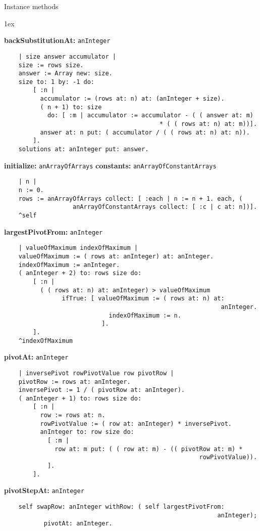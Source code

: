 Instance methods
{\parskip 1ex\par\noindent}
{\bf backSubstitutionAt:} {\tt anInteger}
\begin{verbatim}
    | size answer accumulator |
    size := rows size.
    answer := Array new: size.
    size to: 1 by: -1 do:
        [ :n |
          accumulator := (rows at: n) at: (anInteger + size).
          ( n + 1) to: size
            do: [ :m | accumulator := accumulator - ( ( answer at: m) 
                                           * ( ( rows at: n) at: m))].
          answer at: n put: ( accumulator / ( ( rows at: n) at: n)).
        ].
    solutions at: anInteger put: answer.

\end{verbatim}
{\bf initialize:} {\tt anArrayOfArrays} {\bf constants:} {\tt anArrayOfConstantArrays}
\begin{verbatim}
    | n |
    n := 0.
    rows := anArrayOfArrays collect: [ :each | n := n + 1. each, ( 
                   anArrayOfConstantArrays collect: [ :c | c at: n])].
    ^self

\end{verbatim}
{\bf largestPivotFrom:} {\tt anInteger}
\begin{verbatim}
    | valueOfMaximum indexOfMaximum |
    valueOfMaximum := ( rows at: anInteger) at: anInteger.
    indexOfMaximum := anInteger.
    ( anInteger + 2) to: rows size do:
        [ :n |
          ( ( rows at: n) at: anInteger) > valueOfMaximum
                ifTrue: [ valueOfMaximum := ( rows at: n) at: 
                                                            anInteger.
                             indexOfMaximum := n.
                           ].
        ].
    ^indexOfMaximum 

\end{verbatim}
{\bf pivotAt:} {\tt anInteger}
\begin{verbatim}
    | inversePivot rowPivotValue row pivotRow |
    pivotRow := rows at: anInteger.
    inversePivot := 1 / ( pivotRow at: anInteger).
    ( anInteger + 1) to: rows size do:
        [ :n |
          row := rows at: n.
          rowPivotValue := ( row at: anInteger) * inversePivot.
          anInteger to: row size do:
            [ :m |
              row at: m put: ( ( row at: m) - (( pivotRow at: m) * 
                                                      rowPivotValue)).
            ].
        ].

\end{verbatim}
{\bf pivotStepAt:} {\tt anInteger}
\begin{verbatim}
    self swapRow: anInteger withRow: ( self largestPivotFrom: 
                                                           anInteger);
           pivotAt: anInteger.

\end{verbatim}
